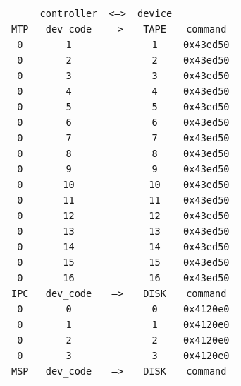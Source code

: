 \begin{adjustwidth}{5ex}{1ex}
	\begin{tabular}{ccccc}
		& \texttt{controller} & \texttt{<-->} & \texttt{device} &  \\
		\texttt{MTP} & \texttt{dev\_code} & \texttt{-->} & \texttt{TAPE} & \texttt{command} \\
		\texttt{0} & \texttt{1} & & \texttt{1} & \texttt{0x43ed50} \\
		\texttt{0} & \texttt{2} & & \texttt{2} & \texttt{0x43ed50} \\
		\texttt{0} & \texttt{3} & & \texttt{3} & \texttt{0x43ed50} \\
		\texttt{0} & \texttt{4} & & \texttt{4} & \texttt{0x43ed50} \\
		\texttt{0} & \texttt{5} & & \texttt{5} & \texttt{0x43ed50} \\
		\texttt{0} & \texttt{6} & & \texttt{6} & \texttt{0x43ed50} \\
		\texttt{0} & \texttt{7} & & \texttt{7} & \texttt{0x43ed50} \\
		\texttt{0} & \texttt{8} & & \texttt{8} & \texttt{0x43ed50} \\
		\texttt{0} & \texttt{9} & & \texttt{9} & \texttt{0x43ed50} \\
		\texttt{0} & \texttt{10} & & \texttt{10} & \texttt{0x43ed50} \\
		\texttt{0} & \texttt{11} & & \texttt{11} & \texttt{0x43ed50} \\
		\texttt{0} & \texttt{12} & & \texttt{12} & \texttt{0x43ed50} \\
		\texttt{0} & \texttt{13} & & \texttt{13} & \texttt{0x43ed50} \\
		\texttt{0} & \texttt{14} & & \texttt{14} & \texttt{0x43ed50} \\
		\texttt{0} & \texttt{15} & & \texttt{15} & \texttt{0x43ed50} \\
		\texttt{0} & \texttt{16} & & \texttt{16} & \texttt{0x43ed50} \\
		\texttt{IPC} & \texttt{dev\_code} & \texttt{-->} & \texttt{DISK} & \texttt{command} \\
		\texttt{0} & \texttt{0} & & \texttt{0} & \texttt{0x4120e0} \\
		\texttt{0} & \texttt{1} & & \texttt{1} & \texttt{0x4120e0} \\
		\texttt{0} & \texttt{2} & & \texttt{2} & \texttt{0x4120e0} \\
		\texttt{0} & \texttt{3} & & \texttt{3} & \texttt{0x4120e0} \\
		\texttt{MSP} & \texttt{dev\_code} & \texttt{-->} & \texttt{DISK} & \texttt{command} \\

\end{tabular}
\end{adjustwidth}

